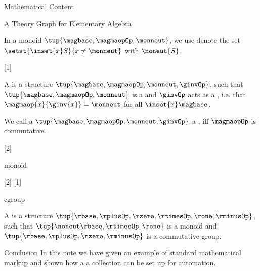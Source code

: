 \documentclass{omdoc}
\begin{document}
\begin{omgroup}[id=sec.math]{Mathematical Content}
\begin{omgroup}[id=sec.math]{A Theory Graph for Elementary Algebra}
\begin{module}[id=monoid]
 \begin{definition}[id=noneut.def]
   In a monoid $\tup{\magbase,\magmaopOp,\monneut}$, we use denote the set
   $\setst{\inset{x}S}{x\ne\monneut}$ with $\noneut{S}$.
 \end{definition}
\end{module}

\begin{module}[id=group]
  [1]{\prefix{}}
  \begin{definition}[id=group.def]
    A  is a structure $\tup{\magbase,\magmaopOp,\monneut,\ginvOp}$, such that
    $\tup{\magbase,\magmaopOp,\monneut}$ is a  and $\ginvOp$ acts as
    a , i.e. that $\magmaop{x}{\ginv{x}}=\monneut$ for all
    $\inset{x}\magbase$.
  \end{definition}
\end{module}

\begin{module}[id=cgroup]
\begin{definition}[id=cgroup.def]
  We call a  $\tup{\magbase,\magmaopOp,\monneut,\ginvOp}$ a
  , iff $\magmaopOp$ is commutative.
\end{definition}
\end{module}

\begin{module}[id=ring]
[2]{\infix{}}
\begin{importmodulevia}{monoid}
  \magbase
  \magmaopOp
  \monneut
\end{importmodulevia}
[2]{\infix{}}
[1]{\prefix{}}
\begin{importmodulevia}{cgroup}
  \magmaopOp
  \monneut
  \ginvOp
\end{importmodulevia}
\begin{definition}
  A  is a structure $\tup{\rbase,\rplusOp,\rzero,\rtimesOp,\rone,\rminusOp}$,
  such that $\tup{\noneut\rbase,\rtimesOp,\rone}$ is a monoid and
  $\tup{\rbase,\rplusOp,\rzero,\rminusOp}$ is a commutative group.
\end{definition}
\end{module}
\end{omgroup}
\end{omgroup}

\begin{omgroup}[id=concl]{Conclusion}
  In this note we have given an example of standard mathematical markup and shown how a a
  {\sTeX} collection can be set up for automation.
\end{omgroup}


\end{document}
